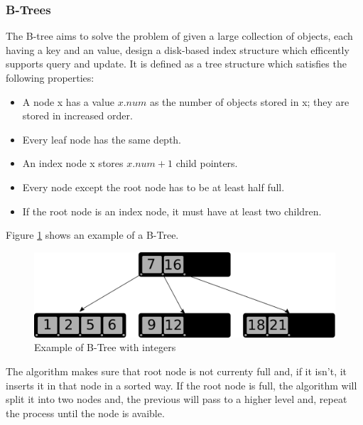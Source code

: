 \documentclass{sig-alternate-05-2015}
\begin{document}
    \subsubsection{B-Trees}
      The B-tree aims to solve the problem of given a large collection of objects, each having a key and an
      value, design a disk-based index structure which efficently supports query and update. It is defined as a tree
      structure which satisfies the following properties:
      \begin{itemize}
        \item A node x has a value $x.num$ as the number of objects stored in x; they are stored in increased order.
        \item Every leaf node has the same depth.
        \item An index node x stores $x.num+1$ child pointers.
        \item Every node except the root node has to be at least half full.
        \item If the root node is an index node, it must have at least two children.
      \end{itemize}
      Figure \ref{img:BTree} shows an example of a B-Tree.
      \begin{figure}[b]
        \centering
        \includegraphics[scale=0.45]{BTree.pdf}
        \caption{Example of B-Tree with integers}
        \label{img:BTree}
      \end{figure}
      The algorithm makes sure that root node is not currenty full and, if it isn't, it inserts it in that node in a sorted
      way. If the root node is full, the algorithm will split it into two nodes and, the previous will pass to a higher level and,
      repeat the process until the node is avaible.
\end{document}
